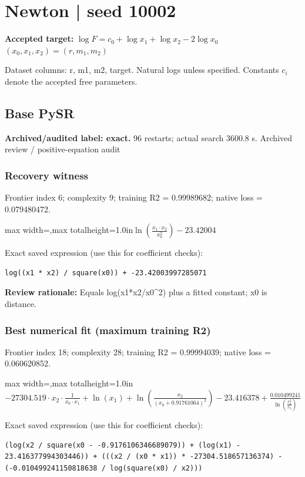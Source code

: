 \documentclass[10pt,letterpaper,landscape]{article}
\begin{document}
\section*{Newton | seed 10002}
\textbf{Accepted target:} $\displaystyle \log F=c_0+\log x_1+\log x_2-2\log x_0$\hfill $(x_0,x_1,x_2)=(r,m_1,m_2)$\par
{\small Dataset columns: r, m1, m2, target. Natural logs unless specified. Constants $c_i$ denote the accepted free parameters.}\par\medskip
\begin{minipage}[t]{0.485\textwidth}
\subsection*{Base PySR}
\textbf{Archived/audited label: exact.} 96 restarts; actual search 3600.8 s.
{\small Archived review / positive-equation audit}
\subsubsection*{Recovery witness}
Frontier index 6; complexity 9; training R2 = 0.99989682; native loss = 0.079480472.
\begin{center}\begin{adjustbox}{max width=\linewidth,max totalheight=1.0in}$\displaystyle \ln{\left(\frac{x_{1} \cdot x_{2}}{x_{0}^{2}} \right)} - 23.42004$\end{adjustbox}\end{center}
{\scriptsize Exact saved expression (use this for coefficient checks):}
\begin{lstlisting}
log((x1 * x2) / square(x0)) + -23.42003997285071
\end{lstlisting}
{\small\textbf{Review rationale:} Equals log(x1*x2/x0\textasciicircum{}2) plus a fitted constant; x0 is distance.}
\subsubsection*{Best numerical fit (maximum training R2)}
Frontier index 18; complexity 28; training R2 = 0.99994039; native loss = 0.060620852.
\begin{center}\begin{adjustbox}{max width=\linewidth,max totalheight=1.0in}$\displaystyle - 27304.519 \cdot x_{2} \cdot \frac{1}{x_{0} \cdot x_{1}} + \ln{\left(x_{1} \right)} + \ln{\left(\frac{x_{2}}{\left(x_{0} + 0.91761064\right)^{2}} \right)} - 23.416378 + \frac{0.010499241}{\ln{\left(\frac{x_{0}^{2}}{x_{2}} \right)}}$\end{adjustbox}\end{center}
{\scriptsize Exact saved expression (use this for coefficient checks):}
\begin{lstlisting}
(log(x2 / square(x0 - -0.9176106346689079)) + (log(x1) - 23.416377994303446)) + (((x2 / (x0 * x1)) * -27304.518657136374) - (-0.010499241150818638 / log(square(x0) / x2)))
\end{lstlisting}
\end{minipage}\hfill
\end{document}
